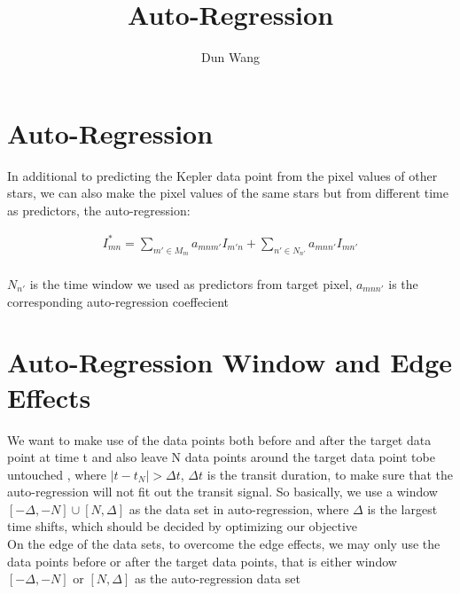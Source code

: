 \documentclass[]{article}
\begin{document}
\title{Auto-Regression}
\author{Dun Wang}
\maketitle

\section{Auto-Regression}
 In additional to predicting the Kepler data point from the pixel values of other stars, we can also make the pixel values of the same stars but from different time as predictors, the auto-regression:

\begin{align*}
  I_{mn}^{*}=\sum_{m' \in M_{m}} a_{mnm'}I_{m'n} + \sum_{n' \in N_{n'}} a_{mnn'}I_{mn'}
\end{align*}
\\
$N_{n'}$ is the time window we used as predictors from target pixel, $a_{mnn'}$ is the corresponding auto-regression coeffecient


\section{Auto-Regression Window and Edge Effects}

We want to make use of the data points both before and after the target data point at time t and also leave N data points around the target data point tobe untouched , where $\left|  t-t_N \right|>\Delta t$, $\Delta t$ is the transit duration, to make sure that the auto-regression will not fit out the transit signal. So basically, we use a window $[-\Delta, -N] \cup [N, \Delta]$ as the data set in auto-regression, where $\Delta$ is the largest time shifts, which should be decided by optimizing our objective
\\
On the edge of the data sets, to overcome the edge effects, we may only use the data points before or after the target data points, that is either window $[-\Delta, -N]$ or $[N, \Delta]$ as the auto-regression data set
\end{document}
